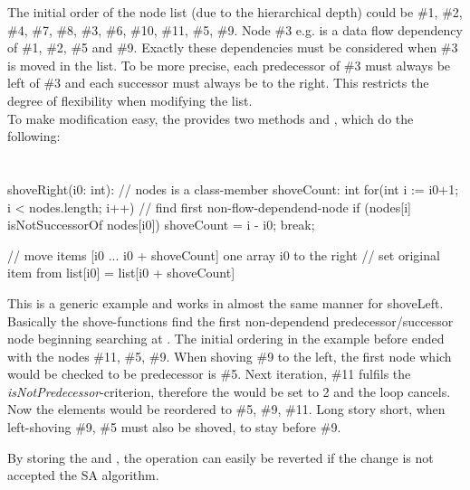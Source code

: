 The initial order of the node list (due to the hierarchical depth) could be \#1, \#2, \#4, \#7, \#8, \#3, \#6, \#10, \#11, \#5, \#9. Node \#3 e.g. is a data flow dependency of \#1, \#2, \#5 and \#9. Exactly these dependencies must be considered when \#3 is moved in the list. To be more precise, each predecessor of \#3 must always be left of \#3 and each successor must always be to the right. This restricts the degree of flexibility when modifying the list.\\
To make modification easy, the  provides two methods  and , which do the following:\\

\\ \\
shoveRight(i0: int):
	// nodes is a class-member
	shoveCount: int
	for(int i := i0+1; i < nodes.length; i++)
		// find first non-flow-dependend-node
		if (nodes[i] isNotSuccessorOf nodes[i0])
			shoveCount = i - i0;
			break;

	// move items  [i0 ... i0 + shoveCount] one array i0 to the right
	// set original item from list[i0] = list[i0 + shoveCount]

This is a generic example and works in almost the same manner for shoveLeft. Basically the shove-functions find the first non-dependend predecessor/successor node beginning searching at . The initial ordering in the example before ended with the nodes \#11, \#5, \#9. When shoving \#9 to the left, the first node which would be checked to be predecessor is \#5. Next iteration, \#11 fulfils the \textit{isNotPredecessor}-criterion, therefore the  would be set to 2 and the loop cancels. Now the elements would be reordered to \#5, \#9, \#11. Long story short, when left-shoving \#9, \#5 must also be shoved, to stay before \#9.\par
By storing the  and , the operation can easily be reverted if the change is not accepted the SA algorithm.\par

